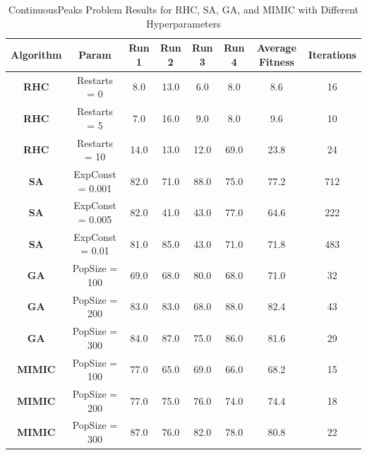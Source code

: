 \begin{table}[h!]
    \centering
    \caption{ContinuousPeaks Problem Results for RHC, SA, GA, and MIMIC with Different Hyperparameters}
    \begin{tabular}{|c|c|c|c|c|c|c|c|}
        \hline
        \textbf{Algorithm} & \textbf{Param} & \textbf{Run 1} & \textbf{Run 2} & \textbf{Run 3} & \textbf{Run 4} & \textbf{Average Fitness} & \textbf{Iterations} \\ \hline
        
        \textbf{RHC} & Restarts = 0 & 8.0 & 13.0 & 6.0 & 8.0 & 8.6 & 16 \\ \hline
        \textbf{RHC} & Restarts = 5 & 7.0 & 16.0 & 9.0 & 8.0 & 9.6 & 10 \\ \hline
        \textbf{RHC} & Restarts = 10 & 14.0 & 13.0 & 12.0 & 69.0 & 23.8 & 24 \\ \hline
        
        \textbf{SA} & ExpConst = 0.001 & 82.0 & 71.0 & 88.0 & 75.0 & 77.2 & 712 \\ \hline
        \textbf{SA} & ExpConst = 0.005 & 82.0 & 41.0 & 43.0 & 77.0 & 64.6 & 222 \\ \hline
        \textbf{SA} & ExpConst = 0.01 & 81.0 & 85.0 & 43.0 & 71.0 & 71.8 & 483 \\ \hline
        
        \textbf{GA} & PopSize = 100 & 69.0 & 68.0 & 80.0 & 68.0 & 71.0 & 32 \\ \hline
        \textbf{GA} & PopSize = 200 & 83.0 & 83.0 & 68.0 & 88.0 & 82.4 & 43 \\ \hline
        \textbf{GA} & PopSize = 300 & 84.0 & 87.0 & 75.0 & 86.0 & 81.6 & 29 \\ \hline
        
        \textbf{MIMIC} & PopSize = 100 & 77.0 & 65.0 & 69.0 & 66.0 & 68.2 & 15 \\ \hline
        \textbf{MIMIC} & PopSize = 200 & 77.0 & 75.0 & 76.0 & 74.0 & 74.4 & 18 \\ \hline
        \textbf{MIMIC} & PopSize = 300 & 87.0 & 76.0 & 82.0 & 78.0 & 80.8 & 22 \\ \hline
        
    \end{tabular}
    \label{tab:continuouspeaks_results}
\end{table}
